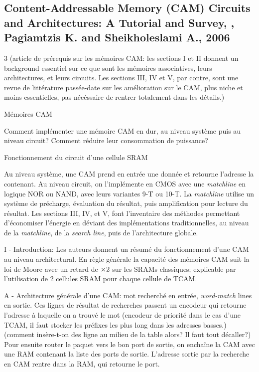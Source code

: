 
\subsection{Content-Addressable Memory (CAM) Circuits and Architectures: A Tutorial and Survey, \cite{pagiamtzis_content-addressable_2006}, Pagiamtzis K. and Sheikholeslami A., 2006}
 3 (article de prérequis sur les mémoires CAM: les sections I et II donnent un background essentiel sur ce que sont les mémoires associatives, leurs architectures, et leurs circuits. Les sections III, IV et V, par contre, sont une revue de littérature passée-date sur les amélioration sur le CAM, plus niche et moins essentielles, pas nécéssaire de rentrer totalement dans les détails.)

 Mémoires CAM

 Comment implémenter une mémoire CAM en dur, au niveau système puis au niveau circuit? Comment réduire leur consommation de puissance?

 Fonctionnement du circuit d'une cellule SRAM \cite{noauthor_static_2023}

 Au niveau système, une CAM prend en entrée une donnée et retourne l'adresse la contenant. Au niveau circuit, on l'implémente en CMOS avec une \emph{matchline} en logique NOR ou NAND, avec leurs variantes 9-T ou 10-T. La \emph{matchline} utilise un système de précharge, évaluation du résultat, puis amplification pour lecture du résultat. Les sections III, IV, et V, font l'inventaire des méthodes permettant d'économiser l'énergie en déviant des implémentations traditionnelles, au niveau de la \emph{matchline}, de la \emph{search line}, puis de l'architecture globale.


I - Introduction: Les auteurs donnent un résumé du fonctionnement d'une CAM au niveau architectural. En règle générale la capacité des mémoires CAM suit la loi de Moore avec un retard de $\times 2$ sur les SRAMs classiques; explicable par l'utilisation de 2 cellules SRAM pour chaque cellule de TCAM. 

A - Architecture générale d'une CAM: mot recherché en entrée, \emph{word-match} lines en sortie. Ces lignes de résultat de recherches passent un encodeur qui retourne l'adresse à laquelle on a trouvé le mot (encodeur de priorité dans le cas d'une TCAM, il faut stocker les préfixes les plus long dans les adresses basses.) (comment insère-t-on des ligne au milieu de la table alors? Il faut tout décaller?) Pour ensuite router le paquet vers le bon port de sortie, on enchaîne la CAM avec une RAM contenant la liste des ports de sortie. L'adresse sortie par la recherche en CAM rentre dans la RAM, qui retourne le port.

